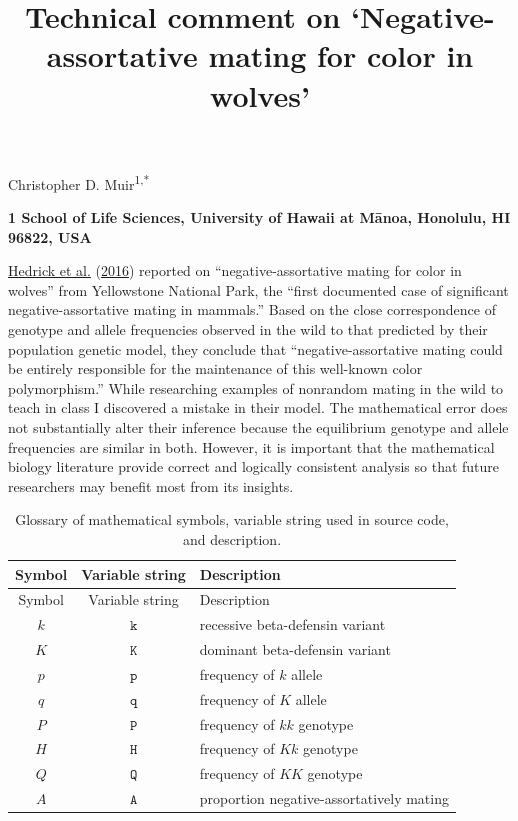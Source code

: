 \documentclass[
]{article}
\title{Technical comment on `Negative-assortative mating for color in wolves'}
\author{}
\date{\vspace{-2.5em}}
\begin{document}
\maketitle

\begin{centering}
Christopher D. Muir\textsuperscript{1,*}

\bf{1} School of Life Sciences, University of Hawaii at M\=anoa, Honolulu, HI 96822, USA
\end{centering}

\protect\hyperlink{ref-hedrick_negative-assortative_2016}{Hedrick et al.} (\protect\hyperlink{ref-hedrick_negative-assortative_2016}{2016}) reported on ``negative-assortative mating for color in wolves'' from Yellowstone National Park, the ``first documented case of significant negative-assortative mating in mammals.'' Based on the close correspondence of genotype and allele frequencies observed in the wild to that predicted by their population genetic model, they conclude that ``negative-assortative mating could be entirely responsible for the maintenance of this well-known color polymorphism.'' While researching examples of nonrandom mating in the wild to teach in class I discovered a mistake in their model. The mathematical error does not substantially alter their inference because the equilibrium genotype and allele frequencies are similar in both. However, it is important that the mathematical biology literature provide correct and logically consistent analysis so that future researchers may benefit most from its insights.

\begin{longtable}[]{@{}ccl@{}}
\caption{\label{tab:symbols}Glossary of mathematical symbols, variable string used in source code, and description.}\tabularnewline
\toprule
Symbol & Variable string & Description \\
\midrule
\endfirsthead
\toprule
Symbol & Variable string & Description \\
\midrule
\endhead
\(k\) & \(\mathtt{k}\) & recessive beta-defensin variant \\
\(K\) & \(\mathtt{K}\) & dominant beta-defensin variant \\
\(p\) & \(\mathtt{p}\) & frequency of \(k\) allele \\
\(q\) & \(\mathtt{q}\) & frequency of \(K\) allele \\
\(P\) & \(\mathtt{P}\) & frequency of \(kk\) genotype \\
\(H\) & \(\mathtt{H}\) & frequency of \(Kk\) genotype \\
\(Q\) & \(\mathtt{Q}\) & frequency of \(KK\) genotype \\
\(A\) & \(\mathtt{A}\) & proportion negative-assortatively mating \\
\bottomrule
\end{longtable}
\end{document}
